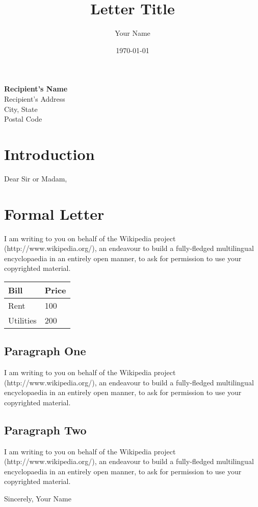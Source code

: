 \documentclass[a4paper, 10pt]{article}
\author{Your Name}
\title{Letter Title}
\date{\today}
\begin{document}
\maketitle

\begin{center}
\textbf{Recipient's Name} \\
Recipient's Address \\
City, State \\
Postal Code
\end{center}

\section{Introduction}
Dear Sir or Madam,

\section{Formal Letter}\label{formal-letter}

I am writing to you on behalf of the Wikipedia project
(http://www.wikipedia.org/), an endeavour to build a fully-fledged
multilingual encyclopaedia in an entirely open manner, to ask for
permission to use your copyrighted material.

\begin{longtable}[]{@{}ll@{}}
\toprule\noalign{}
Bill & Price \\
\midrule\noalign{}
\endhead
\bottomrule\noalign{}
\endlastfoot
Rent & 100 \\
Utilities & 200 \\
\end{longtable}

\subsection{Paragraph One}\label{paragraph-one}

I am writing to you on behalf of the Wikipedia project
(http://www.wikipedia.org/), an endeavour to build a fully-fledged
multilingual encyclopaedia in an entirely open manner, to ask for
permission to use your copyrighted material.

\subsection{Paragraph Two}\label{paragraph-two}

I am writing to you on behalf of the Wikipedia project
(http://www.wikipedia.org/), an endeavour to build a fully-fledged
multilingual encyclopaedia in an entirely open manner, to ask for
permission to use your copyrighted material.

Sincerely,
Your Name
\end{document}
